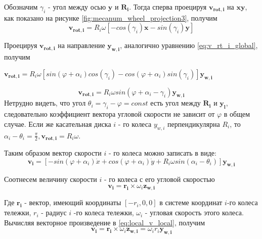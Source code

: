 \documentclass[oneside,final,14pt]{extreport}
\newcommand{\bs}{\boldsymbol}
\begin{document}
Обозначим $\gamma_{i}$ - угол между осью $\bs{y}$ и  $\bs{R_{i}}$. Тогда сперва проецируя $\bs{v_{rot,i}}$   на  $\bs{xy}$, как показано на рисунке \ref{fig:mecanum_wheel_projection3}, получим
\begin{equation}
\bs{v_{rot,i}}
=
R_{i}
\omega
[
-cos(\gamma_{i})
\bs{x}
-
sin(\gamma_{i})
\bs{y}
]
\end{equation}

Проецируя $\bs{v_{rot,i}}$ на направление $\bs{y_{w,i}}$, аналогично уравнению \ref{eq:v_rt_i_global}, получим
\begin{center}
$
\bs{v_{rot,i}}
=
R_{i}
\omega
[
sin(\varphi + \alpha_{i})
cos(\gamma_{i})
-
cos(\varphi+\alpha_{i})
sin(\gamma_{i})
]
\bs{y_{w,i}}
$
\end{center}
\begin{equation}
\bs{v_{rot,i}}
=
R_{i}
\omega
sin(\varphi+\alpha_{i}-\gamma_{i})
\bs{y_{w,i}}
\end{equation}
Нетрудно видеть, что угол $\theta_{i} = \gamma_{i} -\varphi = const$ есть угол между $\bs{R_{i}}$ и $\bs{y_{l}}$, следовательно коэффициент вектора угловой скорости не зависит от $\varphi$ в общем случае. Если же касательная диска $i$ - го колеса $y_{w,i}$  перпендикулярна $R_{i}$, то $\alpha_{i} - \theta_{i} = \frac{\pi}{2}, \bs{v_{rot,i}} = R_{i}\omega$. 
\iffalse
 Кроме того, справедливо 
\begin{gather}
\dot{x}
=
v_{x}\bs{x}
\\
\dot{y}
=
v_{y}\bs{y}
\\
\dot{\varphi}
=
\omega\bs{z}
\end{gather}
Где  $v_{x}$, $v_{x}$, $\omega$ - величина скорости по направлению $\bs{x}$ и $\bs{y}$ соответственно, $\omega$ - величина угловой скорости.
\fi 

Таким образом вектор скорости $i$ - го колеса можно записать в виде:
\begin{equation}
\label{eq:local_v_global}
\bs{v_{i}}
=
[
-sin(\varphi +\alpha_{i})\dot{x}
+cos(\varphi +\alpha_{i})\dot{y}
+
R_{i}
\omega
sin(\alpha_{i} - \theta_{i})
]
\bs{y_{w,i}}
\end{equation}




Соотнесем величину скорости $i$ - го колеса с его угловой скоростью
\begin{equation}
\label{eq:local_v_local}
\bs{v_{i}}
=
\bs{r_{i}}
\times
\omega_{i}
\bs{z_{w,i}}
\end{equation}

Где $\bs{r_{i}}$  - вектор, имеющий координаты $[-r_{i},0,0]$ в системе координат $i$-го колеса тележки, $r_{i}$ - радиус $i$ -го колеса тележки, $\omega_{i}$ - угловая скорость этого колеса.
Вычисляя векторное произведение в \ref{eq:local_v_local}, получим
\begin{equation}
\label{eq:local_v_local_res}
\bs{v_{i}}
=
\bs{r_{i}}
\times
\omega_{i}
\bs{z_{w,i}}
=
\omega_{i}
r_{i}
\bs{y_{w,i}}
\end{equation}
\end{document}
